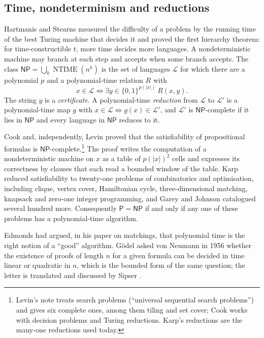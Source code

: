 \documentclass[11pt,reqno]{amsart}
\numberwithin{equation}{section}
\theoremstyle{plain}
\theoremstyle{definition}
\theoremstyle{remark}
\DeclareMathOperator{\NTIME}{NTIME}
\newcommand{\Pc}{\mathsf{P}}
\newcommand{\NP}{\mathsf{NP}}
\begin{document}
\subsection{Time, nondeterminism and reductions}
Hartmanis and Stearns \cite{HS65} measured the difficulty of a problem by the
running time of the best Turing machine that decides it and proved the first
hierarchy theorem: for time-constructible $t$, more time decides more
languages. A nondeterministic machine may branch at each step and accepts when
some branch accepts. The class $\NP=\bigcup_k\NTIME(n^k)$ is the set of
languages $\mathcal L$ for which there are a polynomial $p$ and a polynomial-time
relation $R$ with
\[
x\in\mathcal L\iff \exists y\in\{0,1\}^{p(|x|)}\ R(x,y).
\]
The string $y$ is a \emph{certificate}. A polynomial-time \emph{reduction} from
$\mathcal L$ to $\mathcal L'$ is a polynomial-time map $g$ with $x\in\mathcal
L\iff g(x)\in\mathcal L'$, and $\mathcal L'$ is $\NP$-complete if it lies in
$\NP$ and every language in $\NP$ reduces to it.

Cook \cite{Coo71} and, independently, Levin \cite{Lev73} proved that the
satisfiability of propositional formulas is $\NP$-complete.\footnote{Levin's
note treats search problems (``universal sequential search problems'') and
gives six complete ones, among them tiling and set cover; Cook works with
decision problems and Turing reductions. Karp's reductions are the many-one
reductions used today.} The proof writes the computation of a nondeterministic
machine on $x$ as a table of $p(|x|)^2$ cells and expresses its correctness by
clauses that each read a bounded window of the table. Karp \cite{Kar72} reduced
satisfiability to twenty-one problems of combinatorics and optimisation,
including clique, vertex cover, Hamiltonian cycle, three-dimensional matching,
knapsack and zero-one integer programming, and Garey and Johnson \cite{GJ79}
catalogued several hundred more. Consequently $\Pc=\NP$ if and only if any one
of these problems has a polynomial-time algorithm.

Edmonds \cite{Edm65} had argued, in his paper on matchings, that polynomial time
is the right notion of a ``good'' algorithm. G\"odel asked von Neumann in 1956 whether
the existence of proofs of length $n$ for a given formula can be decided in time
linear or quadratic in $n$, which is the bounded form of the same question; the
letter is translated and discussed by Sipser \cite{Sip92}.
\end{document}
